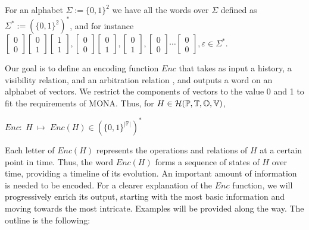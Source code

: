 \documentclass[12pt]{article}
\begin{document}
For an alphabet $\Sigma := \{0,1\}^2$ we have all the words over $\Sigma$ defined as $\Sigma^* := (\{0,1\}^2)^*$, and for instance 
$
\begin{bmatrix}
0 \\ 0
\end{bmatrix}\!\!
\begin{bmatrix}
0 \\ 1
\end{bmatrix}\!\!
\begin{bmatrix}
1 \\ 1
\end{bmatrix}
,
\begin{bmatrix}
0 \\ 0
\end{bmatrix}\!\!
\begin{bmatrix}
0 \\ 1
\end{bmatrix}
,
\begin{bmatrix}
0 \\ 1
\end{bmatrix},
\begin{bmatrix}
0 \\ 0
\end{bmatrix}\!\cdots\!
\begin{bmatrix}
0 \\ 0
\end{bmatrix},\varepsilon
 \in \Sigma^*$.


\vspace{3em}


Our goal is to define an encoding function $Enc$ that takes as input a history, a visibility relation, and an arbitration relation \citep{PrinciplesOfEventualConsistency}, and outputs a word on an alphabet of vectors. We restrict the components of vectors to the value 0 and 1 to fit the requirements of MONA. Thus, for \mbox{$H\in\mathcal{H}(\mathbb{P}, \mathbb{T}, \mathbb{O}, \mathbb{V})$},

\begin{center}
$Enc :\; H\;\mapsto\; Enc(H)\in (\{0,1\}^{|\mathbb{P}|})^*$
\end{center}

Each letter of $Enc(H)$ represents the operations and relations of $H$ at a certain point in time. Thus, the word $Enc(H)$ forms a sequence of states of $H$ over time, providing a timeline of its evolution. An important amount of information is needed to be encoded. For a clearer explanation of the $Enc$ function, we will progressively enrich its output, starting with the most basic information and moving towards the most intricate. Examples will be provided along the way. The outline is the following: 
\end{document}
